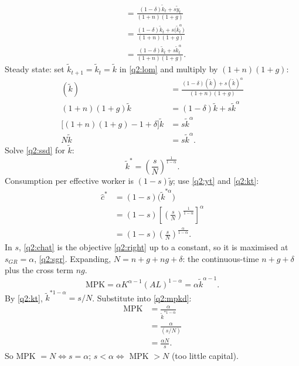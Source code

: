 \begin{sol}
\begin{align}
&= \frac{(1-\delta)\tilde k_t+s\tilde y_t}{(1+n)(1+g)}\nonumber\\
&= \frac{(1-\delta)\tilde k_t+s\big(\tilde k_t^\alpha\big)}{(1+n)(1+g)}\nonumber\\
&= \frac{(1-\delta)\tilde k_t+s\tilde k_t^\alpha}{(1+n)(1+g)}. \label{q2:lom}
\end{align}
Steady state: set $\tilde k_{t+1}=\tilde k_t=\tilde k$ in \eqref{q2:lom} and multiply by $(1+n)(1+g)$:
\begin{align}
(\tilde k) &= \frac{(1-\delta)(\tilde k)+s(\tilde k)^\alpha}{(1+n)(1+g)}\nonumber\\
(1+n)(1+g)\tilde k &= (1-\delta)\tilde k+s\tilde k^\alpha\nonumber\\
\big[(1+n)(1+g)-1+\delta\big]\tilde k &= s\tilde k^\alpha\nonumber\\
N\tilde k &= s\tilde k^\alpha. \label{q2:ssd}
\end{align}
Solve \eqref{q2:ssd} for $\tilde k$:
\begin{equation}
\tilde k^\ast=\left(\frac sN\right)^{\frac1{1-\alpha}}. \label{q2:kt}
\end{equation}
Consumption per effective worker is $(1-s)\tilde y$; use \eqref{q2:yt} and \eqref{q2:kt}:
\begin{align}
\hat c^\ast &= (1-s)\big(\tilde k^{\ast\alpha}\big)\nonumber\\
&= (1-s)\left[\left(\frac sN\right)^{\frac1{1-\alpha}}\right]^{\alpha}\nonumber\\
&= (1-s)\left(\frac sN\right)^{\frac{\alpha}{1-\alpha}}. \label{q2:chat}
\end{align}
In $s$, \eqref{q2:chat} is the objective \eqref{q2:right} up to a constant, so it is maximised at $s_{GR}=\alpha$, \eqref{q2:sgr}.
Expanding, $N=n+g+ng+\delta$: the continuous-time $n+g+\delta$ plus the cross term $ng$.
\begin{equation}
\text{MPK}=\alpha K^{\alpha-1}(AL)^{1-\alpha}=\alpha\tilde k^{\alpha-1}. \label{q2:mpkd}
\end{equation}
By \eqref{q2:kt}, $\tilde k^{\ast1-\alpha}=s/N$. Substitute into \eqref{q2:mpkd}:
\begin{align}
\text{MPK} &= \frac{\alpha}{\tilde k^{\ast1-\alpha}}\nonumber\\
&= \frac{\alpha}{(s/N)}\nonumber\\
&= \frac{\alpha N}{s}. \label{q2:mpkN}
\end{align}
So MPK $=N\iff s=\alpha$; $s<\alpha\iff$ MPK $>N$ (too little capital).

\end{sol}
